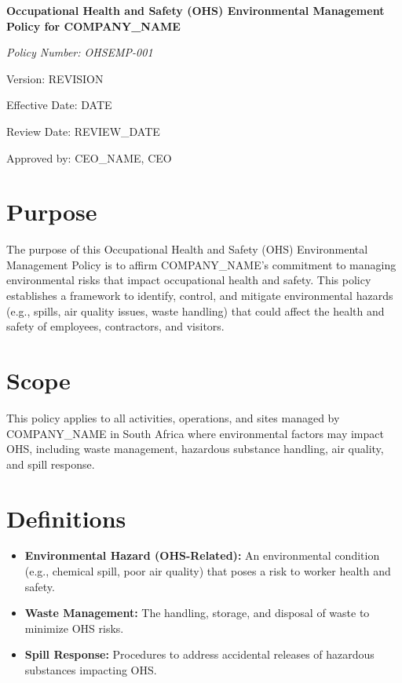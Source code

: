 \documentclass[12pt]{article}
\begin{document}
\begin{titlepage}
    \centering
    \vspace*{2cm}
    {\LARGE\bfseries Occupational Health and Safety (OHS) Environmental Management Policy for {{COMPANY_NAME}}\par}
    \vspace{1cm}
    {\large\itshape Policy Number: OHSEMP-001\par}
    \vspace{0.5cm}
    {\normalsize Version: {{REVISION}}\par}
    \vspace{0.5cm}
    {\normalsize Effective Date: {{DATE}}\par}
    \vspace{0.5cm}
    {\normalsize Review Date: {{REVIEW_DATE}}\par}
    \vspace{2cm}
    {\normalsize Approved by: {{CEO_NAME}}, CEO\par}
\end{titlepage}

\section{Purpose}
The purpose of this Occupational Health and Safety (OHS) Environmental Management Policy is to affirm {{COMPANY_NAME}}'s commitment to managing environmental risks that impact occupational health and safety. This policy establishes a framework to identify, control, and mitigate environmental hazards (e.g., spills, air quality issues, waste handling) that could affect the health and safety of employees, contractors, and visitors.

\section{Scope}
This policy applies to all activities, operations, and sites managed by {{COMPANY_NAME}} in South Africa where environmental factors may impact OHS, including waste management, hazardous substance handling, air quality, and spill response.

\section{Definitions}
\begin{itemize}
    \item \textbf{Environmental Hazard (OHS-Related):} An environmental condition (e.g., chemical spill, poor air quality) that poses a risk to worker health and safety.
    \item \textbf{Waste Management:} The handling, storage, and disposal of waste to minimize OHS risks.
    \item \textbf{Spill Response:} Procedures to address accidental releases of hazardous substances impacting OHS.
\end{itemize}
\end{document}
